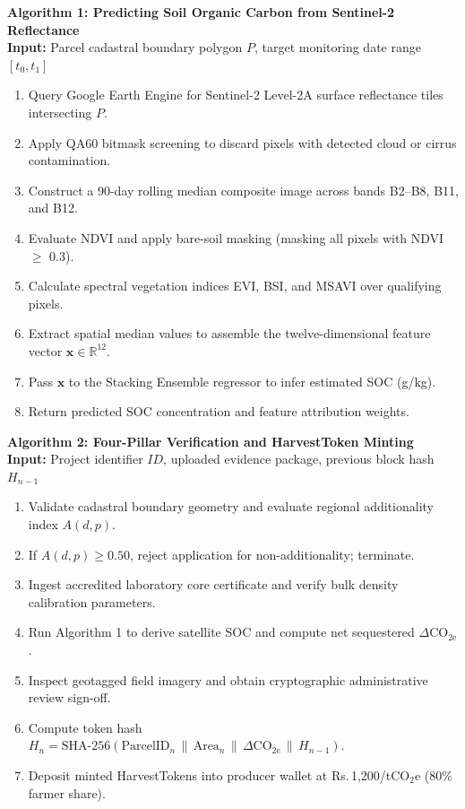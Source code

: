 \documentclass[11pt,a4paper]{article}
\newcommand{\rupee}{Rs.\,}
\begin{document}
\noindent \textbf{Algorithm 1: Predicting Soil Organic Carbon from Sentinel-2 Reflectance} \\
\textbf{Input:} Parcel cadastral boundary polygon $P$, target monitoring date range $[t_0, t_1]$
\begin{enumerate}[noitemsep,topsep=1pt]
    \item Query Google Earth Engine for Sentinel-2 Level-2A surface reflectance tiles intersecting $P$.
    \item Apply QA60 bitmask screening to discard pixels with detected cloud or cirrus contamination.
    \item Construct a 90-day rolling median composite image across bands B2--B8, B11, and B12.
    \item Evaluate NDVI and apply bare-soil masking (masking all pixels with NDVI $\geq$ 0.3).
    \item Calculate spectral vegetation indices EVI, BSI, and MSAVI over qualifying pixels.
    \item Extract spatial median values to assemble the twelve-dimensional feature vector $\mathbf{x} \in \mathbb{R}^{12}$.
    \item Pass $\mathbf{x}$ to the Stacking Ensemble regressor to infer estimated SOC (g/kg).
    \item Return predicted SOC concentration and feature attribution weights.
\end{enumerate}
\vspace{0.8em}

\noindent \textbf{Algorithm 2: Four-Pillar Verification and HarvestToken Minting} \\
\textbf{Input:} Project identifier $ID$, uploaded evidence package, previous block hash $H_{n-1}$
\begin{enumerate}[noitemsep,topsep=1pt]
    \item Validate cadastral boundary geometry and evaluate regional additionality index $A(d,p)$.
    \item If $A(d,p) \geq 0.50$, reject application for non-additionality; terminate.
    \item Ingest accredited laboratory core certificate and verify bulk density calibration parameters.
    \item Run Algorithm 1 to derive satellite SOC and compute net sequestered $\Delta \text{CO}_{2\text{e}}$.
    \item Inspect geotagged field imagery and obtain cryptographic administrative review sign-off.
    \item Compute token hash $H_n = \text{SHA-256}(\text{ParcelID}_n \,\|\, \text{Area}_n \,\|\, \Delta \text{CO}_{2\text{e}} \,\|\, H_{n-1})$.
    \item Deposit minted HarvestTokens into producer wallet at \rupee 1,200/tCO$_2$e (80\% farmer share).
\end{enumerate}
\vspace{1.2em}
\end{document}
